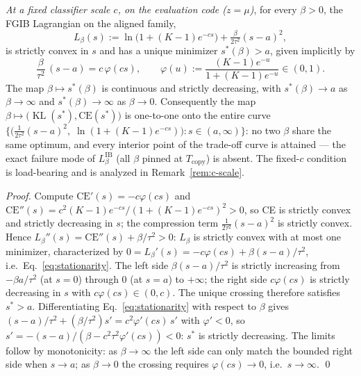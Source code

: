 \begin{proposition}\label{prop:sweep}
\emph{At a fixed classifier scale $c$, on the evaluation code ($z = \mu$)}, for every
$\beta > 0$, the FGIB Lagrangian on the aligned family,
\begin{equation}
L_\beta(s) := \ln\!\big(1 + (K-1)e^{-cs}\big) + \tfrac{\beta}{2\tau^2}(s-a)^2,
\label{eq:fgib-lag}
\end{equation}
is strictly convex in $s$ and has a unique minimizer $s^*(\beta) > a$, given implicitly
by
\begin{equation}
\frac{\beta}{\tau^2}\,(s-a) = c\,\varphi(cs),
\qquad
\varphi(u) := \frac{(K-1)e^{-u}}{1 + (K-1)e^{-u}} \in (0,1) .
\label{eq:stationarity}
\end{equation}
The map $\beta \mapsto s^*(\beta)$ is continuous and strictly decreasing, with
$s^*(\beta) \to a$ as $\beta \to \infty$ and $s^*(\beta) \to \infty$ as $\beta \to 0$.
Consequently the map $\beta \mapsto \big(\operatorname{KL}(s^*), \mathrm{CE}(s^*)\big)$
is one-to-one onto the entire curve
$\{\big(\tfrac{1}{2\tau^2}(s-a)^2,\; \ln(1+(K-1)e^{-cs})\big) : s \in (a, \infty)\}$:
no two
$\beta$ share the same optimum, and every interior point of the trade-off curve is
attained --- the exact failure mode of $L^{\mathrm{IB}}_\beta$ (all $\beta$ pinned at
$T_{\mathrm{copy}}$) is absent. The fixed-$c$ condition is load-bearing and is analyzed
in Remark~\ref{rem:c-scale}.
\end{proposition}

\begin{proof}
Compute $\mathrm{CE}'(s) = -c\varphi(cs)$ and
$\mathrm{CE}''(s) = c^2 (K-1) e^{-cs}/(1 + (K-1)e^{-cs})^2 > 0$, so CE is strictly
convex and strictly decreasing in $s$; the compression term $\tfrac{1}{2\tau^2}(s-a)^2$
is strictly convex. Hence $L_\beta''(s) = \mathrm{CE}''(s) + \beta/\tau^2 > 0$:
$L_\beta$ is
strictly convex with at most one minimizer, characterized by
$0 = L_\beta'(s) = -c\varphi(cs) + \beta(s-a)/\tau^2$, i.e.\
Eq.~\eqref{eq:stationarity}.
The left side $\beta(s-a)/\tau^2$ is strictly increasing from $-\beta a/\tau^2$
(at $s=0$) through $0$
(at $s=a$) to $+\infty$; the right side $c\varphi(cs)$ is strictly decreasing in $s$
with $c\varphi(cs) \in (0, c)$. The unique crossing therefore satisfies $s^* > a$.
Differentiating Eq.~\eqref{eq:stationarity} with respect to $\beta$ gives
$(s-a)/\tau^2 + (\beta/\tau^2) s' = c^2\varphi'(cs)\,s'$ with $\varphi' < 0$, so
$s' = -(s-a)/(\beta - c^2\tau^2\varphi'(cs)) < 0$: $s^*$ is strictly decreasing.
The limits follow by monotonicity: as $\beta \to \infty$ the left side can only match
the bounded right side when $s \to a$; as $\beta \to 0$ the crossing requires
$\varphi(cs)\to 0$, i.e.\ $s \to \infty$. \hfill\qed
\end{proof}

